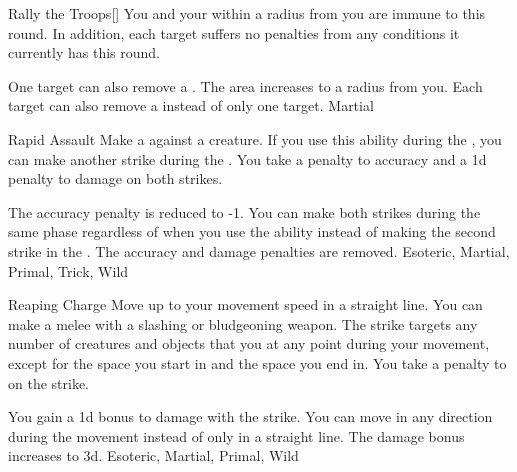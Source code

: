 \lowercase{\hypertarget{maneuver:Rally the Troops}{}}\label{maneuver:Rally the Troops}
\hypertarget{maneuver:Rally the Troops}{}
\begin{freeability}{Rally the Troops}[]
You and your  within a \areamed radius from you are immune to  this round.
In addition, each target suffers no penalties from any conditions it currently has this round.

\rankline
{} One target can also remove a .
 The area increases to a \arealarge radius from you.
 Each target can also remove a  instead of only one target.
 Martial
\end{freeability}
\vspace{0.25em}



\lowercase{\hypertarget{maneuver:Rapid Assault}{}}\label{maneuver:Rapid Assault}
\hypertarget{maneuver:Rapid Assault}{}
\begin{freeability}{Rapid Assault}
Make a  against a creature.
If you use this ability during the , you can make another strike during the .
You take a  penalty to accuracy and a \minus1d penalty to damage on both strikes.

\rankline
{} The accuracy penalty is reduced to -1.
 You can make both strikes during the same phase regardless of when you use the ability instead of making the second strike in the .
 The accuracy and damage penalties are removed.
 Esoteric, Martial, Primal, Trick, Wild
\end{freeability}
\vspace{0.25em}



\lowercase{\hypertarget{maneuver:Reaping Charge}{}}\label{maneuver:Reaping Charge}
\hypertarget{maneuver:Reaping Charge}{}
\begin{freeability}{Reaping Charge}
Move up to your movement speed in a straight line.
You can make a melee  with a slashing or bludgeoning weapon.
The strike targets any number of creatures and objects that you  at any point during your movement, except for the space you start in and the space you end in.
You take a  penalty to  on the strike.

\rankline
{} You gain a \plus1d bonus to damage with the strike.
 You can move in any direction during the movement instead of only in a straight line.
 The damage bonus increases to \plus3d.
 Esoteric, Martial, Primal, Wild
\end{freeability}
\vspace{0.25em}



